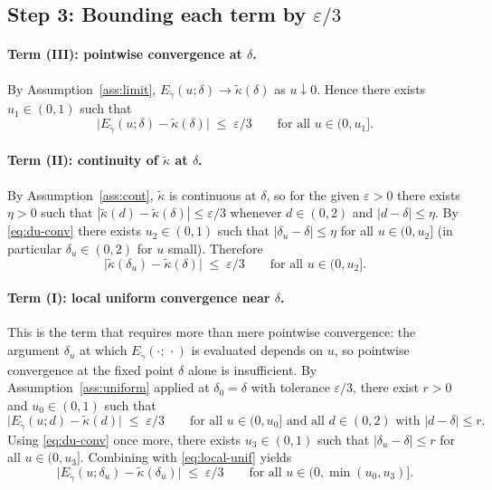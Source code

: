 \documentclass[11pt]{article}
\theoremstyle{definition}
\newcommand{\eps}{\varepsilon}
\begin{document}
\subsection*{Step 3: Bounding each term by $\eps/3$}

\paragraph{Term (III): pointwise convergence at $\delta$.}
By Assumption~\ref{ass:limit}, $E_{\tilde\gamma}(u;\delta)\to\tilde\kappa(\delta)$ as
$u\downarrow 0$. Hence there exists $u_1\in(0,1)$ such that
\begin{equation}\label{eq:bound3}
\bigl|E_{\tilde\gamma}(u;\delta)-\tilde\kappa(\delta)\bigr|\;\le\;\eps/3
\qquad\text{for all }u\in(0,u_1].
\end{equation}

\paragraph{Term (II): continuity of $\tilde\kappa$ at $\delta$.}
By Assumption~\ref{ass:cont}, $\tilde\kappa$ is continuous at $\delta$,
so for the given $\eps>0$ there exists $\eta>0$ such that
$|\tilde\kappa(d)-\tilde\kappa(\delta)|\le\eps/3$ whenever
$d\in(0,2)$ and $|d-\delta|\le\eta$. By \eqref{eq:du-conv} there
exists $u_2\in(0,1)$ such that $|\delta_u-\delta|\le\eta$ for all
$u\in(0,u_2]$ (in particular $\delta_u\in(0,2)$ for $u$ small).
Therefore
\begin{equation}\label{eq:bound2}
\bigl|\tilde\kappa(\delta_u)-\tilde\kappa(\delta)\bigr|\;\le\;\eps/3
\qquad\text{for all }u\in(0,u_2].
\end{equation}

\paragraph{Term (I): local uniform convergence near $\delta$.}
This is the term that requires more than mere pointwise convergence:
the argument $\delta_u$ at which $E_{\tilde\gamma}(\cdot;\,\cdot)$ is
evaluated depends on $u$, so pointwise convergence at the fixed point
$\delta$ alone is insufficient. By
Assumption~\ref{ass:uniform} applied at $\delta_0=\delta$ with tolerance
$\eps/3$, there exist $r>0$ and $u_0\in(0,1)$ such that
\begin{equation}\label{eq:local-unif}
\bigl|E_{\tilde\gamma}(u;d)-\tilde\kappa(d)\bigr|\;\le\;\eps/3
\qquad
\text{for all }u\in(0,u_0]\text{ and all }d\in(0,2)\text{ with }
|d-\delta|\le r.
\end{equation}
Using \eqref{eq:du-conv} once more, there exists $u_3\in(0,1)$ such
that $|\delta_u-\delta|\le r$ for all $u\in(0,u_3]$. Combining with
\eqref{eq:local-unif} yields
\begin{equation}\label{eq:bound1}
\bigl|E_{\tilde\gamma}(u;\delta_u)-\tilde\kappa(\delta_u)\bigr|\;\le\;\eps/3
\qquad\text{for all }u\in(0,\min(u_0,u_3)].
\end{equation}
\end{document}
